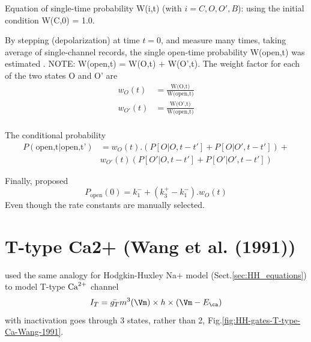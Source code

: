 Equation of single-time probability W(i,t) (with $i=C, O, O', B$): using the
initial condition W(C,0) = 1.0.  

By stepping (depolarization) at time $t=0$, and measure many times, taking
average of single-channel records, the single open-time probability W(open,t)
was estimated \citep{yue1990csi}. NOTE: W(open,t) = W(O,t) + W(O',t). The weight
factor for each of the two states O and O' are
\begin{equation}
\begin{split}
w_O(t) &= \frac{\text{W(O,t)}}{\text{W(open,t)}} \\
w_{O'}(t) &= \frac{\text{W(O',t)}}{\text{W(open,t)}} \\
\end{split}
\end{equation}

The conditional probability
\begin{equation}
\begin{split}
P(\text{open,t|open,t'}) &= w_O(t).\left( P[O|O,t-t'] + P[O|O',t-t'] \right) +
\\
  & w_{O'}(t) \left( P[O'|O,t-t'] + P[O'|O',t-t'] \right)
\end{split}
\end{equation}

Finally, \citep{Keizer1992} proposed
\begin{equation}
P_\text{open}(0) = k_1^- + (k_3^+ - k_1^-).w_O(t)
\end{equation}
Even though the rate constants are manually selected.

\section{T-type Ca2+ (Wang et al. (1991))}
\label{sec:T-type-Ca2+-Wang-1991}
\label{sec:LCC_Wang1991}

\citep{wang1991} used the same analogy for Hodgkin-Huxley Na+ model
(Sect.\ref{sec:HH_equations}) to model T-type ${\text{Ca}^{2+}}$ channel
\begin{equation}
I_T = \bar{g_T} m^3(\Vm) \times h \times (\Vm - E_\ca)
\end{equation}
with inactivation goes through 3 states, rather than 2,
Fig.\ref{fig:HH-gates-T-type-Ca-Wang-1991}.

